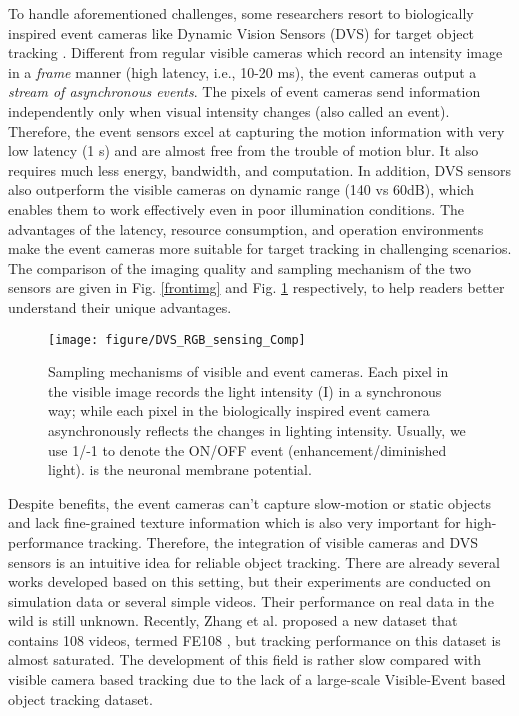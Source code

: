 \documentclass[journal]{IEEEtran}
\begin{document}
 
To handle aforementioned challenges, some researchers resort to biologically inspired event cameras like Dynamic Vision Sensors (DVS) \cite{2008dvs} for target object tracking \cite{chen2020eventTrack, ramesh2020etld, camunas2017event, chen2019asynchronouseventtrack, yang2019dashnet}. Different from regular visible cameras which record an intensity image in a \emph{frame} manner (high latency, i.e., 10-20 ms), the event cameras output a \emph{stream of asynchronous events}. The pixels of event cameras send information independently only when visual intensity changes (also called an event). Therefore, the event sensors excel at capturing the motion information with very low latency (1 s) and are almost free from the trouble of motion blur. It also requires much less energy, bandwidth, and computation. In addition, DVS sensors also outperform the visible cameras on dynamic range (140 vs 60dB), which enables them to work effectively even in poor illumination conditions. The advantages of the latency, resource consumption, and operation environments make the event cameras more suitable for target tracking in challenging scenarios. The comparison of the imaging quality and sampling mechanism of the two sensors are given in Fig. \ref{frontimg} and Fig. \ref{sampleScheme} respectively, to help readers better understand their unique advantages. 


\begin{figure} 
\center
\texttt{[image: figure/DVS\_RGB\_sensing\_Comp]}
\caption{Sampling mechanisms of visible and event cameras. Each pixel in the visible image records the light intensity (I) in a synchronous way; while each pixel in the biologically inspired event camera asynchronously reflects the changes in lighting intensity. Usually, we use 1/-1 to denote the ON/OFF event (enhancement/diminished light).  is the neuronal membrane potential.}
\label{sampleScheme}
\end{figure} 




Despite benefits, the event cameras can't capture slow-motion or static objects and lack fine-grained texture information which is also very important for high-performance tracking. Therefore, the integration of visible cameras and DVS sensors is an intuitive idea for reliable object tracking. There are already several works \cite{liu2016combined, chen2019asynchronouseventtrack, huang2018event, yang2019dashnet} developed based on this setting, but their experiments are conducted on simulation data or several simple videos. Their performance on real data in the wild is still unknown. Recently, Zhang et al. proposed a new dataset that contains 108 videos, termed FE108 \cite{Zhang2021FE108}, but tracking performance on this dataset is almost saturated. The development of this field is rather slow compared with visible camera based tracking due to the lack of a large-scale Visible-Event based object tracking dataset. 
\end{document}
